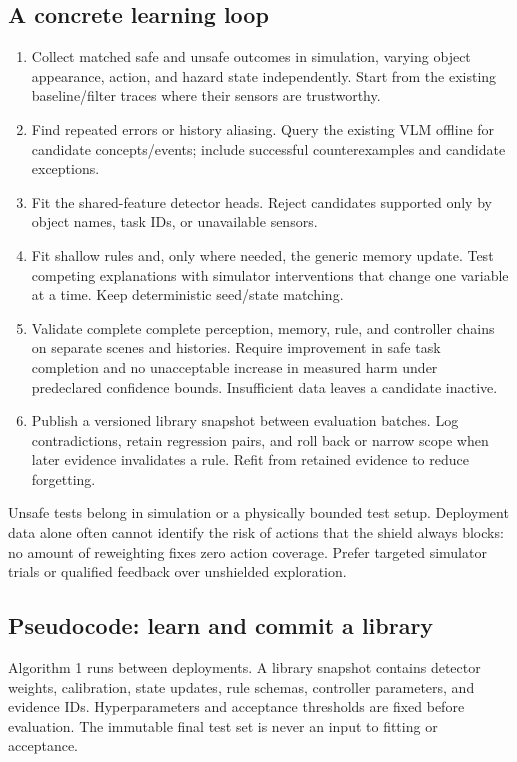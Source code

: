 \documentclass[10pt]{article}
\begin{document}
\subsection{A concrete learning loop}
\begin{enumerate}
\item Collect matched safe and unsafe outcomes in simulation, varying object appearance, action, and hazard state independently. Start from the existing baseline/filter traces where their sensors are trustworthy.
\item Find repeated errors or history aliasing. Query the existing VLM offline for candidate concepts/events; include successful counterexamples and candidate exceptions.
\item Fit the shared-feature detector heads. Reject candidates supported only by object names, task IDs, or unavailable sensors.
\item Fit shallow rules and, only where needed, the generic memory update. Test competing explanations with simulator interventions that change one variable at a time. Keep deterministic seed/state matching.
\item Validate complete complete perception, memory, rule, and controller chains on separate scenes and histories. Require improvement in safe task completion and no unacceptable increase in measured harm under predeclared confidence bounds. Insufficient data leaves a candidate inactive.
\item Publish a versioned library snapshot between evaluation batches. Log contradictions, retain regression pairs, and roll back or narrow scope when later evidence invalidates a rule. Refit from retained evidence to reduce forgetting.
\end{enumerate}

Unsafe tests belong in simulation or a physically bounded test setup. Deployment data alone often cannot identify the risk of actions that the shield always blocks: no amount of reweighting fixes zero action coverage. Prefer targeted simulator trials or qualified feedback over unshielded exploration.

\subsection{Pseudocode: learn and commit a library}
Algorithm 1 runs between deployments. A library snapshot contains detector weights, calibration, state updates, rule schemas, controller parameters, and evidence IDs. Hyperparameters and acceptance thresholds are fixed before evaluation. The immutable final test set is never an input to fitting or acceptance.
\end{document}
